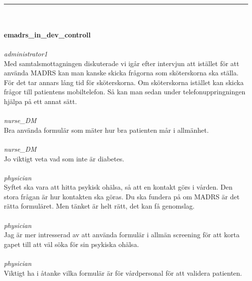 \documentclass[12pt,a4paper,oneside]{article}
\begin{document}
\ \vspace{.66em}\\
\hrule
\ \vspace{.33em}\\
\ \\{\bf emadrs\_in\_dev\_controll }
\\\ \\%
 { \it administrator1 %
}\\ 
Med samtalsmottagningen diskuterade vi ig{\aa}r efter intervjun att ist{\"a}llet f{\"o}r att anv{\"a}nda MADRS kan man kanske skicka fr{\aa}gorna som sk{\"o}terskorna ska st{\"a}lla. F{\"o}r det tar annars l{\aa}ng tid f{\"o}r sk{\"o}terskorna. Om sk{\"o}terskorna ist{\"a}llet kan skicka fr{\aa}gor till patientens mobiltelefon. S{\aa} kan man sedan under telefonuppringningen hj{\"a}lpa p{\aa} ett annat s{\"a}tt.  %
\ \\\ \\
 { \it   nurse\_DM %
}\\ 
Bra anv{\"a}nda formul{\"a}r som m{\"a}ter hur bra patienten m{\aa}r i allm{\"a}nhet.  %
\ \\\ \\
 { \it   nurse\_DM %
}\\ 
Jo viktigt veta vad som inte {\"a}r diabetes. %
\ \\\ \\
 { \it   physician %
}\\ 
 Syftet ska vara att hitta psykisk oh{\"a}lsa, s{\aa} att en kontakt g{\"o}rs i v{\aa}rden. Den stora fr{\aa}gan {\"a}r hur kontakten ska g{\"o}ras. Du ska fundera p{\aa} om MADRS {\"a}r det r{\"a}tta formul{\"a}ret. Men t{\"a}nket {\"a}r helt r{\"a}tt, det kan f{\aa} genomslag.  %
\ \\\ \\
 { \it   physician %
}\\ 
Jag {\"a}r mer intresserad av att anv{\"a}nda formul{\"a}r i allm{\"a}n screening f{\"o}r att korta gapet till att v{\"a}l s{\"o}ka f{\"o}r sin psykiska oh{\"a}lsa.  %
\ \\\ \\
 { \it   physician %
}\\ 
Viktigt ha i {\aa}tanke vilka formul{\"a}r {\"a}r f{\"o}r v{\aa}rdpersonal f{\"o}r att validera patienten. %
\end{document}
